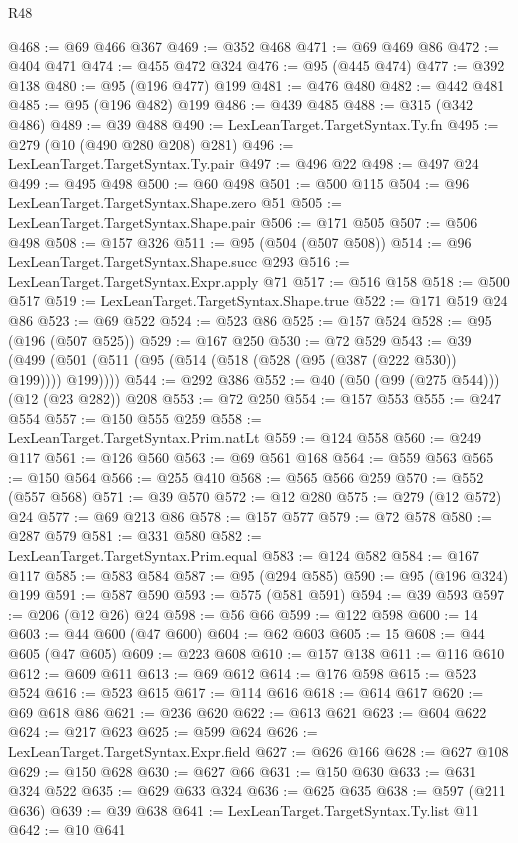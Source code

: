 \begin{lexlean}{R48}
\begin{coremodule}
@468 := @69 @466 @367
@469 := @352 @468
@471 := @69 @469 @86
@472 := @404 @471
@474 := @455 @472 @324
@476 := @95 (@445 @474)
@477 := @392 @138
@480 := @95 (@196 @477) @199
@481 := @476 @480
@482 := @442 @481
@485 := @95 (@196 @482) @199
@486 := @439 @485
@488 := @315 (@342 @486)
@489 := @39 @488
@490 := LexLeanTarget.TargetSyntax.Ty.fn
@495 := @279 (@10 (@490 @280 @208) @281)
@496 := LexLeanTarget.TargetSyntax.Ty.pair
@497 := @496 @22
@498 := @497 @24
@499 := @495 @498
@500 := @60 @498
@501 := @500 @115
@504 := @96 LexLeanTarget.TargetSyntax.Shape.zero @51
@505 := LexLeanTarget.TargetSyntax.Shape.pair
@506 := @171 @505
@507 := @506 @498
@508 := @157 @326
@511 := @95 (@504 (@507 @508))
@514 := @96 LexLeanTarget.TargetSyntax.Shape.succ @293
@516 := LexLeanTarget.TargetSyntax.Expr.apply @71
@517 := @516 @158
@518 := @500 @517
@519 := LexLeanTarget.TargetSyntax.Shape.true
@522 := @171 @519 @24 @86
@523 := @69 @522
@524 := @523 @86
@525 := @157 @524
@528 := @95 (@196 (@507 @525))
@529 := @167 @250
@530 := @72 @529
@543 := @39 (@499 (@501 (@511 (@95 (@514 (@518 (@528 (@95 (@387 (@222 @530)) @199)))) @199))))
@544 := @292 @386
@552 := @40 (@50 (@99 (@275 @544))) (@12 (@23 @282)) @208
@553 := @72 @250
@554 := @157 @553
@555 := @247 @554
@557 := @150 @555 @259
@558 := LexLeanTarget.TargetSyntax.Prim.natLt
@559 := @124 @558
@560 := @249 @117
@561 := @126 @560
@563 := @69 @561 @168
@564 := @559 @563
@565 := @150 @564
@566 := @255 @410
@568 := @565 @566 @259
@570 := @552 (@557 @568)
@571 := @39 @570
@572 := @12 @280
@575 := @279 (@12 @572) @24
@577 := @69 @213 @86
@578 := @157 @577
@579 := @72 @578
@580 := @287 @579
@581 := @331 @580
@582 := LexLeanTarget.TargetSyntax.Prim.equal
@583 := @124 @582
@584 := @167 @117
@585 := @583 @584
@587 := @95 (@294 @585)
@590 := @95 (@196 @324) @199
@591 := @587 @590
@593 := @575 (@581 @591)
@594 := @39 @593
@597 := @206 (@12 @26) @24
@598 := @56 @66
@599 := @122 @598
@600 := 14
@603 := @44 @600 (@47 @600)
@604 := @62 @603
@605 := 15
@608 := @44 @605 (@47 @605)
@609 := @223 @608
@610 := @157 @138
@611 := @116 @610
@612 := @609 @611
@613 := @69 @612
@614 := @176 @598
@615 := @523 @524
@616 := @523 @615
@617 := @114 @616
@618 := @614 @617
@620 := @69 @618 @86
@621 := @236 @620
@622 := @613 @621
@623 := @604 @622
@624 := @217 @623
@625 := @599 @624
@626 := LexLeanTarget.TargetSyntax.Expr.field
@627 := @626 @166
@628 := @627 @108
@629 := @150 @628
@630 := @627 @66
@631 := @150 @630
@633 := @631 @324 @522
@635 := @629 @633 @324
@636 := @625 @635
@638 := @597 (@211 @636)
@639 := @39 @638
@641 := LexLeanTarget.TargetSyntax.Ty.list @11
@642 := @10 @641

\end{coremodule}
\end{lexlean}
